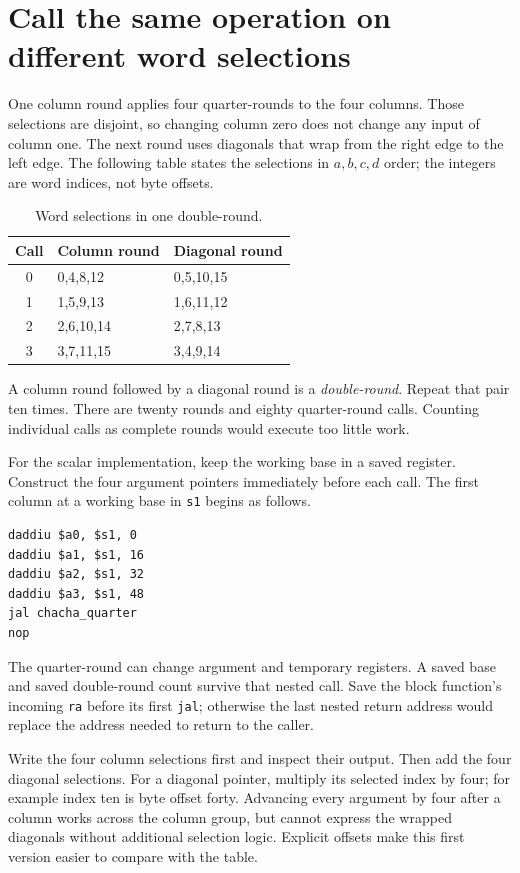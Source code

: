 \section{Call the same operation on different word selections}
One column round applies four quarter-rounds to the four columns. Those selections
are disjoint, so changing column zero does not change any input of column one.
The next round uses diagonals that wrap from the right edge to the left edge.
The following table states the selections in \(a,b,c,d\) order; the integers are
word indices, not byte offsets.

\begin{table}[htbp]
  \centering\caption{Word selections in one double-round.}
  \begin{tabular}{cll}\toprule
    Call & Column round & Diagonal round \\\midrule
    0    & 0,4,8,12     & 0,5,10,15      \\
    1    & 1,5,9,13     & 1,6,11,12      \\
    2    & 2,6,10,14    & 2,7,8,13       \\
    3    & 3,7,11,15    & 3,4,9,14       \\
    \bottomrule\end{tabular}
\end{table}

A column round followed by a diagonal round is a \emph{double-round}. Repeat that
pair ten times. There are twenty rounds and eighty quarter-round calls. Counting
individual calls as complete rounds would execute too little work.

For the scalar implementation, keep the working base in a saved register. Construct
the four argument pointers immediately before each call. The first column at a
working base in \texttt{s1} begins as follows.
\begin{verbatim}
daddiu $a0, $s1, 0
daddiu $a1, $s1, 16
daddiu $a2, $s1, 32
daddiu $a3, $s1, 48
jal chacha_quarter
nop
\end{verbatim}

The quarter-round can change argument and temporary registers. A saved base and
saved double-round count survive that nested call. Save the block function's incoming
\texttt{ra} before its first \texttt{jal}; otherwise the last nested return address
would replace the address needed to return to the caller.

Write the four column selections first and inspect their output. Then add the four
diagonal selections. For a diagonal pointer, multiply its selected index by four;
for example index ten is byte offset forty. Advancing every argument by four after
a column works across the column group, but cannot express the wrapped diagonals
without additional selection logic. Explicit offsets make this first version easier
to compare with the table.
